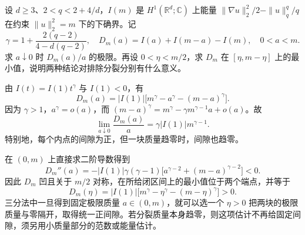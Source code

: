 \begin{exercise}\label{b2:ex:app-F-6}
设 \(d\ge3\)、\(2<q<2+4/d\)，\(I(m)\) 是 \(H^1(\mathbb R^d;\mathbb C)\) 上能量
\(\|\nabla u\|_2^2/2-\|u\|_q^q/q\)
在约束 \(\|u\|_2^2=m\) 下的下确界。记
\[
 \gamma=1+\frac{2(q-2)}{4-d(q-2)},\quad
 D_m(a)=I(a)+I(m-a)-I(m),\quad 0<a<m.
\]
求 \(a\downarrow0\) 时 \(D_m(a)/a\) 的极限。再设 \(0<\eta<m/2\)，求 \(D_m\) 在 \([\eta,m-\eta]\) 上的最小值，说明两种结论对排除分裂分别有什么意义。
\end{exercise}
\begin{solution}
由 \(I(t)=I(1)t^\gamma\) 与 \(I(1)<0\)，有
\[
 D_m(a)=|I(1)|\bigl[m^\gamma-a^\gamma-(m-a)^\gamma\bigr].
\]
因为 \(\gamma>1\)，\(a^\gamma=o(a)\)，而
\((m-a)^\gamma=m^\gamma-\gamma m^{\gamma-1}a+o(a)\)。故
\[
 \lim_{a\downarrow0}\frac{D_m(a)}a
 =\gamma|I(1)|m^{\gamma-1}.
\]
特别地，每个内点的间隙为正，但一块质量趋零时，间隙也趋零。

在 \((0,m)\) 上直接求二阶导数得到
\[
 D_m''(a)=-|I(1)|\gamma(\gamma-1)
 \bigl[a^{\gamma-2}+(m-a)^{\gamma-2}\bigr]<0.
\]
因此 \(D_m\) 凹且关于 \(m/2\) 对称，在所给闭区间上的最小值位于两个端点，并等于
\[
 D_m(\eta)=|I(1)|\bigl[m^\gamma-\eta^\gamma-(m-\eta)^\gamma\bigr]>0.
\]
三分法中一旦得到固定极限质量 \(a\in(0,m)\)，就可以选一个 \(\eta>0\) 把两块的极限质量与零隔开，取得统一正间隙。若分裂质量本身趋零，则这项估计不再给固定间隙，须另用小质量部分的范数或能量估计。
\end{solution}

